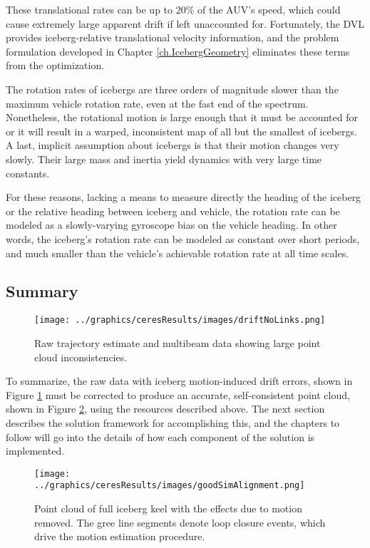 These translational rates can be up to 20\% of the AUV's speed, which could cause extremely large apparent drift if left unaccounted for. Fortunately, the DVL provides iceberg-relative translational velocity information, and the problem formulation developed in Chapter \ref{ch.IcebergGeometry} eliminates these terms from the optimization.

The rotation rates of icebergs are three orders of magnitude slower than the maximum vehicle rotation rate, even at the fast end of the spectrum. Nonetheless, the rotational motion is large enough that it must be accounted for or it will result in a warped, inconsistent map of all but the smallest of icebergs. A last, implicit assumption about icebergs is that their motion changes very slowly. Their large mass and inertia yield dynamics with very large time constants. 

For these reasons, lacking a means to measure directly the heading of the iceberg or the relative heading between iceberg and vehicle, the rotation rate can be modeled as a slowly-varying gyroscope bias on the vehicle heading. In other words, the iceberg's rotation rate can be modeled as constant over short periods, and much smaller than the vehicle's achievable rotation rate at all time scales.

\subsection{Summary}

\begin{figure}[htb]
   \centering
   \texttt{[image: ../graphics/ceresResults/images/driftNoLinks.png]} %
   \caption{Raw trajectory estimate and multibeam data showing large point cloud inconsistencies. }
   \label{fig:DRIFT}
\end{figure}

To summarize, the raw data with iceberg motion-induced drift errors, shown in Figure \ref{fig:DRIFT} must be corrected to produce an accurate, self-consistent point cloud, shown in Figure \ref{fig:SOLUTION}, using the resources described above. The next section describes the solution framework for accomplishing this, and the chapters to follow will go into the details of how each component of the solution is implemented.

\begin{figure}[htb]
   \centering
   \texttt{[image: ../graphics/ceresResults/images/goodSimAlignment.png]} %
   \caption{Point cloud of full iceberg keel with the effects due to motion removed. The gree line segments denote loop closure events, which drive the motion estimation procedure. }
   \label{fig:SOLUTION}
\end{figure}

